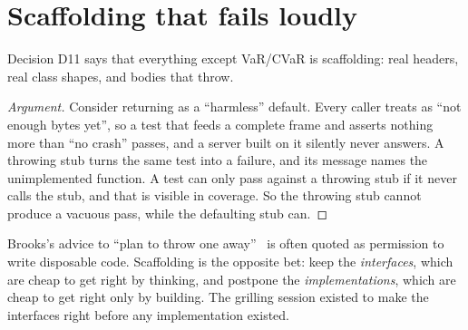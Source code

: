 \section{Scaffolding that fails loudly}
Decision D11 says that everything except VaR/CVaR is scaffolding: real headers, real class shapes, and bodies that throw.



\begin{proof}[Argument]
Consider  returning  as a ``harmless'' default. Every caller treats
 as ``not enough bytes yet'', so a test that feeds a complete frame and asserts nothing more than ``no crash''
passes, and a server built on it silently never answers. A throwing stub turns the same test into a failure, and its
message names the unimplemented function. A test can only pass against a throwing stub if it never calls the stub, and that
is visible in coverage. So the throwing stub cannot produce a vacuous pass, while the defaulting stub can.
\end{proof}

\begin{history}
Brooks's advice to ``plan to throw one away''~\cite{brooks1975mythical} is often quoted as permission to write disposable
code. Scaffolding is the opposite bet: keep the \emph{interfaces}, which are cheap to get right by thinking,
and postpone the \emph{implementations}, which are cheap to get right only by building. The grilling session existed to make the
interfaces right before any implementation existed.
\end{history}

